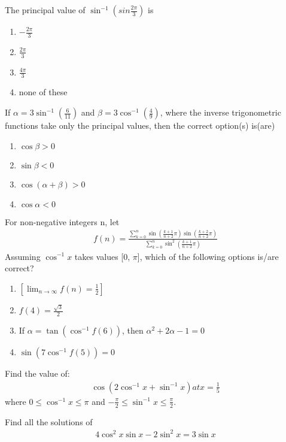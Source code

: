 \item The principal value of $\sin^{-1}(sin\frac{2\pi}{3})$ is
\begin{enumerate}
\item $-\frac{2\pi}{3}$
\item $\frac{2\pi}{3}$
\item $\frac{4\pi}{3}$
\item none of these
\end{enumerate}

\item If $\alpha = 3\sin^{-1}(\frac{6}{11})$ and $\beta = 3\cos^{-1}(\frac{4}{9})$, where the inverse trigonometric functions take only the principal values, then the correct option(s) is(are)
\begin{enumerate}   
\item $\cos\beta > 0$
\item $\sin\beta < 0$
\item $\cos(\alpha + \beta) > 0$
\item $\cos\alpha < 0$
\end{enumerate}

\item For non-negative integers n, let
\begin{align*}
f(n) = \frac{\sum_{k=0}^{n}\sin(\frac{k+1}{n+2}\pi)\sin(\frac{k+2}{n+2}\pi)}{\sum_{k=0}^{n}\sin^2(\frac{k+1}{n+2}\pi)}
\end{align*}
Assuming $\cos^{-1}x$ takes values [0, $\pi$], which of the following options is/are correct?
\begin{enumerate}
\item $[ \lim_{n \to \infty} f(n) = \frac{1}{2}]$
\item $f(4) = \frac{\sqrt{3}}{2}$
\item If $\alpha = \tan(\cos^{-1}{f(6)})$, then $\alpha^2 + 2\alpha - 1 = 0$
\item $\sin(7\cos^{-1}{f(5)}) = 0$
\end {enumerate}

\item Find the value of: 
\begin{align*}
\cos(2\cos^{-1}{x} + \sin^{-1}{x}) at x = \frac{1}{5}
\end{align*}
where $0 \leq \cos^{-1}{x} \leq \pi$ and $-\frac{\pi}{2} \leq \sin^{-1}{x} \leq \frac{\pi}{2}$.

\item Find all the solutions of 
\begin{align*}
4\cos^{2}x \sin x - 2\sin^{2}x = 3\sin x
\end{align*} 

